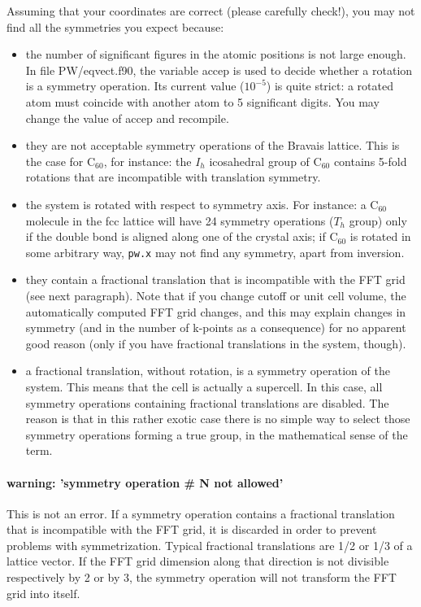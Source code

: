 \documentclass[12pt,a4paper]{article}
\def\pw.x{\texttt{pw.x}}
\begin{document}
Assuming that your coordinates are correct (please carefully check!),
you may not find all the symmetries you expect because:
\begin{itemize}
\item the number of significant figures in the atomic positions is not
  large enough. In file PW/eqvect.f90, the variable accep is used to
  decide whether a rotation is a symmetry operation. Its current value
  ($10^{-5}$) is quite strict: a rotated atom must coincide with
  another atom to 5 significant digits. You may change the value of
  accep and recompile. 
\item they are not acceptable symmetry operations of the Bravais
  lattice. This is the case for C$_{60}$, for instance: the $I_h$
  icosahedral group of C$_{60}$ contains 5-fold rotations that are
  incompatible with translation symmetry.  
\item  the system is rotated with respect to symmetry axis. For
  instance: a C$_{60}$ molecule in the fcc lattice will have 24
  symmetry operations ($T_h$ group) only if the double bond is
  aligned along one of the crystal axis; if C$_{60}$ is rotated
  in some arbitrary way, \pw.x may not find any symmetry, apart from
  inversion. 
\item they contain a fractional translation that is incompatible with
  the FFT grid (see next paragraph). Note that if you change cutoff or
  unit cell volume, the automatically computed FFT grid changes, and
  this may explain changes in symmetry (and in the number of k-points
  as a consequence) for no apparent good reason (only if you have
  fractional translations in the system, though). 
\item a fractional translation, without rotation, is a symmetry
  operation of the system. This means that the cell is actually a
  supercell. In this case, all symmetry operations containing
  fractional translations are disabled. The reason is that in this
  rather exotic case there is no simple way to select those symmetry
  operations forming a true group, in the mathematical sense of the
  term. 
\end{itemize}

\paragraph{warning: 'symmetry operation \# N not allowed'}
This is not an error.  If a symmetry operation contains a fractional
translation that is incompatible with the FFT grid, it is discarded in
order to prevent problems with symmetrization. Typical fractional 
translations are 1/2 or 1/3 of a lattice vector. If the FFT grid
dimension along that direction is not divisible respectively by 2 or
by 3, the symmetry operation will not transform the FFT grid into
itself. 
\end{document}
